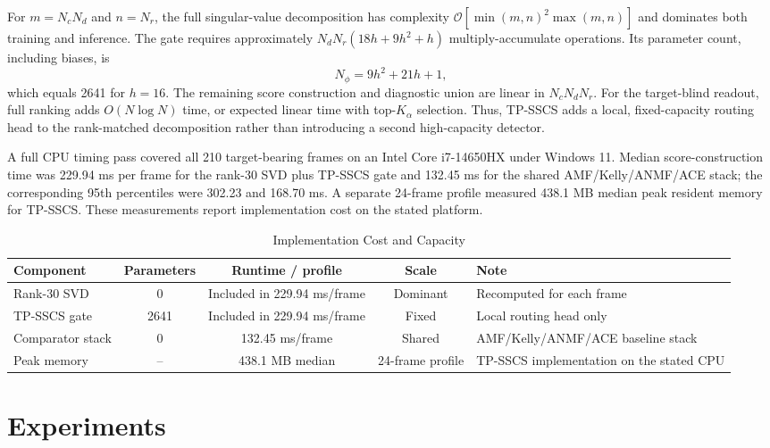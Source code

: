 \documentclass[journal]{IEEEtran}
\begin{document}
For $m=N_cN_d$ and $n=N_r$, the full singular-value decomposition has complexity $\mathcal{O}[\min(m,n)^2\max(m,n)]$ and dominates both training and inference. The gate requires approximately $N_dN_r(18h+9h^2+h)$ multiply-accumulate operations. Its parameter count, including biases, is
\begin{equation}
    N_{\phi}=9h^2+21h+1,
\end{equation}
which equals 2641 for $h=16$. The remaining score construction and diagnostic union are linear in $N_cN_dN_r$. For the target-blind readout, full ranking adds $O(N\log N)$ time, or expected linear time with top-$K_\alpha$ selection. Thus, TP-SSCS adds a local, fixed-capacity routing head to the rank-matched decomposition rather than introducing a second high-capacity detector.

A full CPU timing pass covered all 210 target-bearing frames on an Intel Core i7-14650HX under Windows 11. Median score-construction time was 229.94 ms per frame for the rank-30 SVD plus TP-SSCS gate and 132.45 ms for the shared AMF/Kelly/ANMF/ACE stack; the corresponding 95th percentiles were 302.23 and 168.70 ms. A separate 24-frame profile measured 438.1 MB median peak resident memory for TP-SSCS. These measurements report implementation cost on the stated platform.

\begin{table}[!t]
\caption{Implementation Cost and Capacity}
\label{tab:implementation-cost}
\centering
\footnotesize
\setlength{\tabcolsep}{4.5pt}
\renewcommand{\arraystretch}{1.08}
\begin{tabularx}{\textwidth}{@{}lcccX@{}}
\toprule
Component & Parameters & Runtime / profile & Scale & Note \\
\midrule
Rank-30 SVD & 0 & Included in 229.94 ms/frame & Dominant & Recomputed for each frame \\
TP-SSCS gate & 2641 & Included in 229.94 ms/frame & Fixed & Local routing head only \\
Comparator stack & 0 & 132.45 ms/frame & Shared & AMF/Kelly/ANMF/ACE baseline stack \\
Peak memory & -- & 438.1 MB median & 24-frame profile & TP-SSCS implementation on the stated CPU \\
\bottomrule
\end{tabularx}
\end{table}

\section{Experiments}
\end{document}
